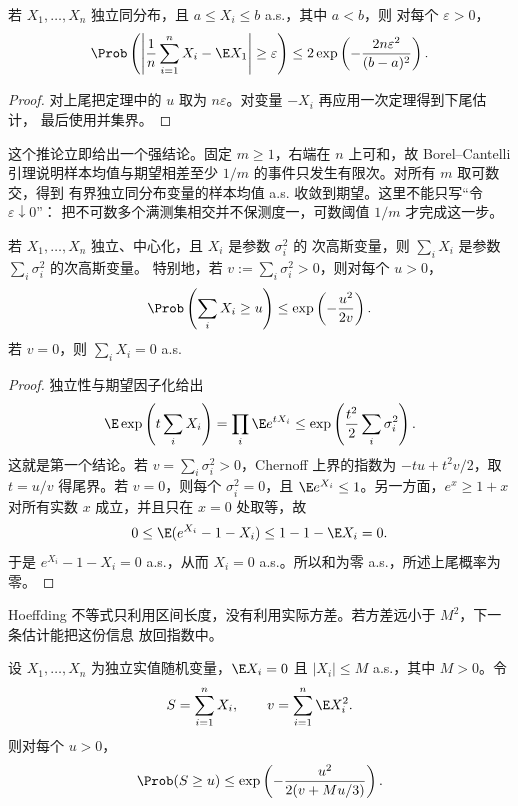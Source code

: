 \begin{corollary}[样本均值的双侧界]\label{corollary:5-4-1-hoeffding-two-sided}
若 $X_1,\dots,X_n$ 独立同分布，且 $a\leq X_i\leq b$ a.s.，其中 $a<b$，则
对每个 $\varepsilon>0$，
\[
 \Prob\left(
 \left|\frac1n\sum_{i=1}^nX_i-\E X_1\right|\geq\varepsilon
 \right)
 \leq2\exp\left(-\frac{2n\varepsilon^2}{(b-a)^2}\right).
\]
\end{corollary}

\begin{proof}
对上尾把定理中的 $u$ 取为 $n\varepsilon$。对变量 $-X_i$ 再应用一次定理得到下尾估计，
最后使用并集界。
\end{proof}

这个推论立即给出一个强结论。固定 $m\geq1$，右端在 $n$ 上可和，故 Borel--Cantelli
引理说明样本均值与期望相差至少 $1/m$ 的事件只发生有限次。对所有 $m$ 取可数交，得到
有界独立同分布变量的样本均值 a.s. 收敛到期望。这里不能只写“令 $\varepsilon\downarrow0$”：
把不可数多个满测集相交并不保测度一，可数阈值 $1/m$ 才完成这一步。

\begin{proposition}[次高斯变量之和]\label{proposition:5-4-1-3}
若 $X_1,\dots,X_n$ 独立、中心化，且 $X_i$ 是参数 $\sigma_i^2$ 的
次高斯变量，则 $\sum_iX_i$ 是参数 $\sum_i\sigma_i^2$ 的次高斯变量。
特别地，若 $v:=\sum_i\sigma_i^2>0$，则对每个 $u>0$，
\[
 \Prob\left(\sum_iX_i\geq u\right)
 \leq\exp\left(-\frac{u^2}{2v}\right).
\]
若 $v=0$，则 $\sum_iX_i=0$ a.s.
\end{proposition}

\begin{proof}
独立性与期望因子化给出
\[
 \E\exp\left(t\sum_iX_i\right)
 =\prod_i\E e^{tX_i}
 \leq\exp\left(\frac{t^2}{2}\sum_i\sigma_i^2\right).
\]
这就是第一个结论。若 $v=\sum_i\sigma_i^2>0$，Chernoff 上界的指数为
$-tu+t^2v/2$，取 $t=u/v$ 得尾界。若 $v=0$，则每个 $\sigma_i^2=0$，且
$\E e^{X_i}\leq1$。另一方面，$e^x\geq1+x$ 对所有实数 $x$ 成立，并且只在 $x=0$ 处取等，故
\[
 0\leq\E(e^{X_i}-1-X_i)\leq1-1-\E X_i=0.
\]
于是 $e^{X_i}-1-X_i=0$ a.s.，从而 $X_i=0$ a.s.。所以和为零 a.s.，所述上尾概率为零。
\end{proof}

Hoeffding 不等式只利用区间长度，没有利用实际方差。若方差远小于 $M^2$，下一条估计能把这份信息
放回指数中。

\begin{proposition}[Bernstein 型界（选读）]\label{proposition:5-4-1-4}
设 $X_1,\dots,X_n$ 为独立实值随机变量，$\E X_i=0$ 且
$|X_i|\leq M$ a.s.，其中 $M>0$。令
\[
 S=\sum_{i=1}^nX_i,\qquad v=\sum_{i=1}^n\E X_i^2.
\]
则对每个 $u>0$，
\[
 \Prob(S\geq u)
 \leq\exp\left(-\frac{u^2}{2(v+Mu/3)}\right).
\]
\end{proposition}

